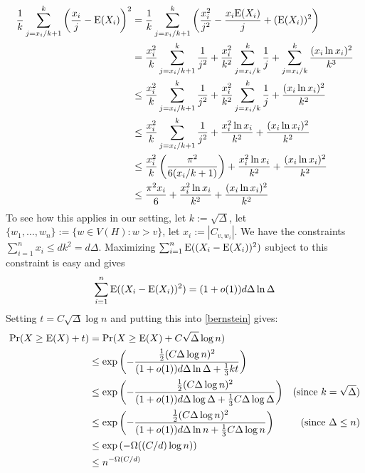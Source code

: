 \documentclass{patmorin}
\begin{document}
\begin{align*}
\frac{1}{k}\sum_{j=x_i/k+1}^k \left(\frac{x_i}{j}-\mathrm{E}(X_i)\right)^2
 & = \frac{1}{k}\sum_{j=x_i/k+1}^k \left(\frac{x_i^2}{j^2}-\frac{x_i \mathrm{E}(X_i)}{j} + (\mathrm{E}(X_i))^2\right) \\
 & = \frac{x_i^2}{k}\sum_{j=x_i/k+1}^k\frac{1}{j^2}
   + \frac{x_i^2}{k^2}\sum_{j=x_i/k}^k\frac{1}{j} + \sum_{j=x_i/k}^k\frac{(x_i\ln x_i)^2}{k^3} \\
 & \le \frac{x_i^2}{k}\sum_{j=x_i/k+1}^k\frac{1}{j^2}
   + \frac{x_i^2}{k^2}\sum_{j=x_i/k}^k\frac{1}{j} + \frac{(x_i\ln x_i)^2}{k^2}\\
 & \le \frac{x_i^2}{k}\sum_{j=x_i/k+1}^k\frac{1}{j^2}
    + \frac{x_i^2\ln x_i}{k^2} + \frac{(x_i\ln x_i)^2}{k^2} \\
 & \le \frac{x_i^2}{k}\left(\frac{\pi^2}{6(x_i/k+1)}\right)
    + \frac{x_i^2\ln x_i}{k^2} + \frac{(x_i\ln x_i)^2}{k^2} \\
  & \le \frac{\pi^2 x_i}{6}
     + \frac{x_i^2\ln x_i}{k^2} + \frac{(x_i\ln x_i)^2}{k^2} \\
\end{align*}
To see how this applies in our setting, let $k:=\sqrt{\Delta}$, let $\{w_1,\ldots,w_n\}:=\{w\in V(H):w>v\}$, let $x_i:=|C_{v,w_i}|$.  We have the constraints $\sum_{i=1}^n x_i \le dk^2=d\Delta$.  Maximizing $\sum_{i=1}^n\mathrm{E}((X_i-\mathrm{E}(X_i))^2)$ subject to this constraint is easy and gives
\[
  \sum_{i=1}^n\mathrm{E}((X_i-\mathrm{E}(X_i))^2) = (1+o(1))d\Delta\ln \Delta
\]
Setting $t=C\sqrt{\Delta}\log n$ and putting this into \cref{bernstein} gives:
\begin{align*}
  \Pr(X\ge \mathrm{E}(X)+t)
  & = \Pr(X\ge \mathrm{E}(X)+C\sqrt{\Delta}\log n) \\
  & \le \exp \left(-\frac{\tfrac{1}{2}(C\Delta\log n)^2}{(1+o(1))d\Delta\ln\Delta + \tfrac{1}{3}kt}\right) \\
  & \le \exp \left(-\frac{\tfrac{1}{2}(C\Delta\log n)^2}{(1+o(1))d\Delta\log\Delta + \tfrac{1}{3}C\Delta\log\Delta}\right) & \text{(since $k=\sqrt{\Delta}$)} \\
  & \le \exp \left(-\frac{\tfrac{1}{2}(C\Delta\log n)^2}{(1+o(1))d\Delta\ln n + \tfrac{1}{3}C\Delta\log n}\right) & \text{(since $\Delta \le n$)} \\
  & \le \exp \left(-\Omega((C/d)\log n)\right) \\
  & \le n^{-\Omega(C/d)}
\end{align*}
\end{document}
